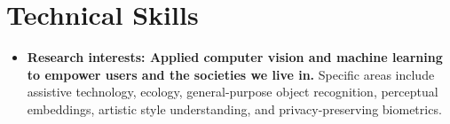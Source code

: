 \documentclass[10pt,letterpaper]{article}
\begin{document}
\section*{Technical Skills}
\vspace{-4pt}
\begin{itemize}
\item \textbf{Research interests: Applied computer vision and machine learning to empower users and the societies we live in.} Specific areas include assistive technology, ecology, general-purpose object recognition, perceptual embeddings, artistic style understanding, and privacy-preserving biometrics.


\end{itemize}
\end{document}
